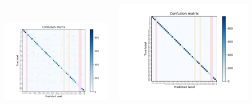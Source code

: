 \documentclass[8pt]{beamer}
\begin{document}
\begin{frame}
\begin{columns}
	\includegraphics[height=4cm, width=6cm]{../plots/k49_confusion_matrix_default.png}
	\includegraphics[height=5cm, width=7cm]{../plots/confusion_matrix_20.png}
\end{columns}\end{frame}

\end{document}
